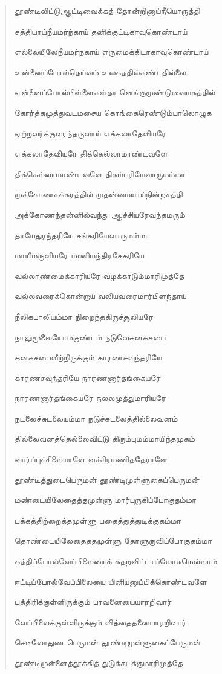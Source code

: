 \documentclass{article}
\begin{document}
\begin{quotation}
{தூண்டிலிட்டுஆட்டிவைக்கத் தோன்றினாய்நீயொருத்தி

சத்தியாய்நீயமர்ந்தாய் தனிக்குட்டிகாவுகொண்டாய்

எல்லையிலேநீயமர்நதாய் எருமைக்கிடாகாவுகொண்டாய்

உன்னைப்போல்தெய்வம் உலகததில்கண்டதில்லை

என்னைப்போல்பிள்ளைகள்தா னெங்குமுண்டுவையகத்தில்

கோர்த்தமுத்துவடமசைய கொங்கைரெண்டும்பாலொழுக

ஏற்றவர்க்குவரந்தருவாய் எக்கலாதேவியரே

எக்கலாதேவியரே திக்கெல்லாமாண்டவளே

திக்கெல்லாமாண்டவளே திகம்பரியேவாருமம்மா

முக்கோணசக்கரத்தில் முதன்மையாய்நின்றசத்தி

அக்கோணந்தன்னில்வந்து ஆச்சியரேவந்தமரும்

தாயேதுரந்தரியே சங்கரியேவாருமம்மா

மாயிமருளியரே மணிமந்திரசேகரியே

வல்லாண்மைக்காரியரே வழக்காடும்மாரிமுத்தே

வல்லவரைக்கொன்றாய் வலியவரைமார்பிளந்தாய்

நீலிகபாலியம்மா நிறைந்ததிருச்சூலியரே

நாலுமூலையோமகுண்டம் நடுவேகனகசபை

கனகசபைவீற்றிருக்கும் காரணசவுந்தரியே

காரணசவுந்தரியே நாரணனார்தங்கையரே

நாரணனார்தங்கையரே நலலமுத்துமாரியரே

நடலைச்சுடலையம்மா நடுச்சுடலைத்தில்லைவனம்

தில்லைவனத்தெல்லைவிட்டு திரும்புமம்மாயிந்தமுகம்

வார்ப்புச்சிலையாளே வச்சிரமணிததேராளே

தூண்டித்துடைபெருமன் தூண்டிமுள்ளுகைப்பெருமன்

மண்டையிலேதைத்தமுள்ளு மார்புருகிப்போகுதம்மா

பக்கத்திற்றைத்தமுள்ளு பதைத்துத்துடிக்குதம்மா

தொண்டையிலேதைததமுள்ளு தோளுருவிப்போகுதம்மா

கத்திப்போல்வேப்பிலையைக் கதறவிட்டாய்லோகமெல்லாம்

ஈட்டிப்போல்வேப்பிலையை யினியனுப்பிக்கொண்டவளே

பத்திரிக்குள்ளிருக்கும் பாவனையையாரறிவார்

வேப்பிலைக்குள்ளிருக்கும் வித்தைதனையாரறிவார்

செடிலோதுடைபெருமன் தூண்டிமுள்ளுகைப்பேருமன்

தூண்டிமுள்ளைத்தூக்கித் துடுக்கடக்குமாரிமுத்தே

}
\end{quotation}
\end{document}
